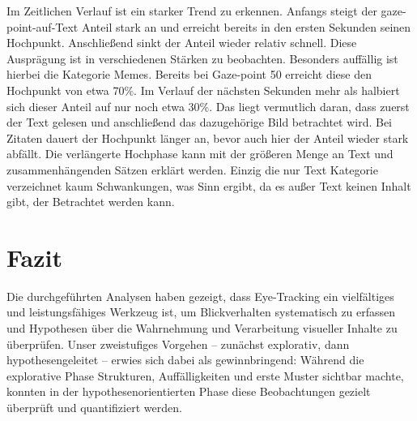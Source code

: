 \documentclass[
    language=german, %
    thesis=seminar, %
    supervisor=postdoc, %
    multiauthor=true, %
    ]{settings/csssa-thesis}
\begin{document}
Im Zeitlichen Verlauf ist ein starker Trend zu erkennen. Anfangs steigt der gaze-point-auf-Text Anteil stark an und erreicht 
bereits in den ersten Sekunden seinen Hochpunkt. Anschlie{\ss}end sinkt der Anteil wieder relativ schnell. 
Diese Ausprägung ist in verschiedenen Stärken zu beobachten. Besonders auffällig ist hierbei die Kategorie Memes. 
Bereits bei Gaze-point 50 erreicht diese den Hochpunkt von etwa 70\%. Im Verlauf der nächsten Sekunden 
mehr als halbiert sich dieser Anteil auf nur noch etwa 30\%. Das liegt vermutlich daran, dass zuerst der Text 
gelesen und anschlie{\ss}end das dazugehörige Bild betrachtet wird. Bei Zitaten dauert der Hochpunkt länger an, 
bevor auch hier der Anteil wieder stark abfällt. Die verlängerte Hochphase kann mit der grö{\ss}eren Menge an Text 
und zusammenhängenden Sätzen erklärt werden. Einzig die nur Text Kategorie verzeichnet kaum Schwankungen, 
was Sinn ergibt, da es au{\ss}er Text keinen Inhalt gibt, der Betrachtet werden kann. 

\section{Fazit}

Die durchgeführten Analysen haben gezeigt, dass Eye-Tracking ein vielfältiges und leistungsfähiges Werkzeug ist, 
um Blickverhalten systematisch zu erfassen und Hypothesen über die Wahrnehmung und Verarbeitung visueller Inhalte 
zu überprüfen. Unser zweistufiges Vorgehen – zunächst explorativ, dann hypothesengeleitet – erwies sich dabei als 
gewinnbringend: Während die explorative Phase Strukturen, Auffälligkeiten und erste Muster sichtbar machte, 
konnten in der hypothesenorientierten Phase diese Beobachtungen gezielt überprüft und quantifiziert werden. 
\end{document}
